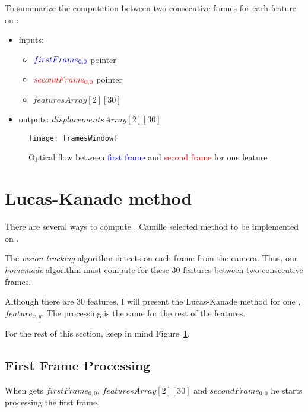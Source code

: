 To summarize the  computation between two consecutive frames for each feature on \vc:
\begin{itemize}
	\item inputs:
		\begin{itemize}
			\item $\textcolor{blue}{firstFrame_{0,0}}$ pointer
			\item $\textcolor{red}{secondFrame_{0,0}}$ pointer
			\item {} $featuresArray[2][30]$
		\end{itemize}
	\item outputs:  $displacementsArray[2][30]$
\end{itemize}

\begin{figure}[!htbp]
	\centering
	\texttt{[image: framesWindow]}
	\caption{Optical flow between \textcolor{blue}{first frame} and \textcolor{red}{second frame} for one feature}
	\label{framesWindowFig}
\end{figure}
\FloatBarrier


\section{Lucas-Kanade method}

There are several ways to compute . Camille selected  method to be implemented on \vc.

The \emph{vision tracking} algorithm detects  on each frame from the camera. Thus, our \emph{homemade} algorithm must compute  for these 30 features between two consecutive frames.

Although there are 30 features, I will present the Lucas-Kanade method for one , $feature_{x,y}$. The processing is the same for the rest of the features.

For the rest of this section, keep in mind Figure~\ref{framesWindowFig}.

\subsection{First Frame Processing}

When \vc{} gets $firstFrame_{0,0}$,  $featuresArray[2][30]$ and $secondFrame_{0,0}$ he starts processing the first frame.

